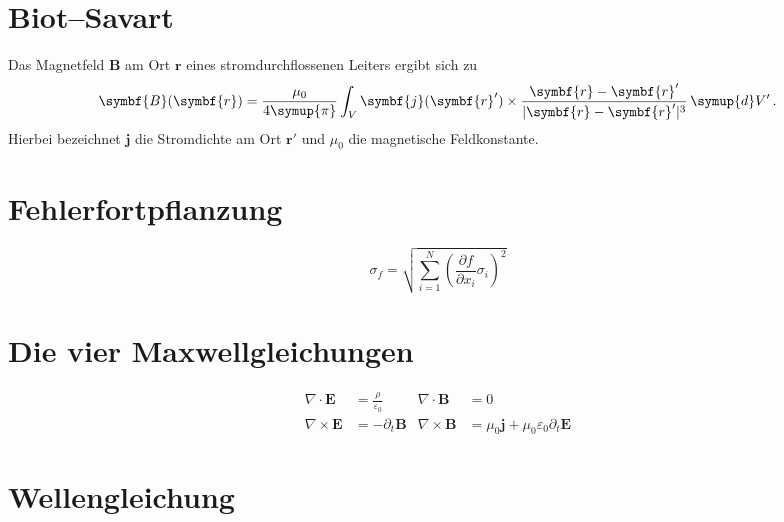 \documentclass{scrartcl}
\begin{document}
\section{Biot--Savart}

Das Magnetfeld $\symbf{B}$ am Ort $\symbf{r}$ eines stromdurchflossenen Leiters ergibt sich zu
\begin{equation}
  \symbf{B}(\symbf{r}) = \frac{\mu_0}{4 \symup{\pi}}
    \int_V \symbf{j}(\symbf{r}') \times
      \frac{\symbf{r} - \symbf{r}'}{\lvert \symbf{r} - \symbf{r}' \rvert^3}
      \, \symup{d}V' \, .
\end{equation}
Hierbei bezeichnet $\symbf{j}$ die Stromdichte am Ort $\symbf{r}'$
und $\mu_0$ die magnetische Feldkonstante.

\section{Fehlerfortpflanzung}

\begin{equation}
  \sigma_f = \sqrt{
    \sum\limits_{i = 1}^N
      \left( \frac{\partial f}{\partial x_i} \sigma_i \right)^{\!\! 2}
  }
\end{equation}

\section{Die vier Maxwellgleichungen}

\begin{align}
  \nabla \cdot  \symbf{E} &= \frac{\rho}{\varepsilon_0} &
  \nabla \cdot  \symbf{B} &= 0 \\
  \nabla \times \symbf{E} &= - \partial_t \symbf{B} &
  \nabla \times \symbf{B} &= \mu_0 \symbf{j} + \mu_0 \varepsilon_0 \partial_t \symbf{E}
\end{align}

\section{Wellengleichung}
\end{document}
